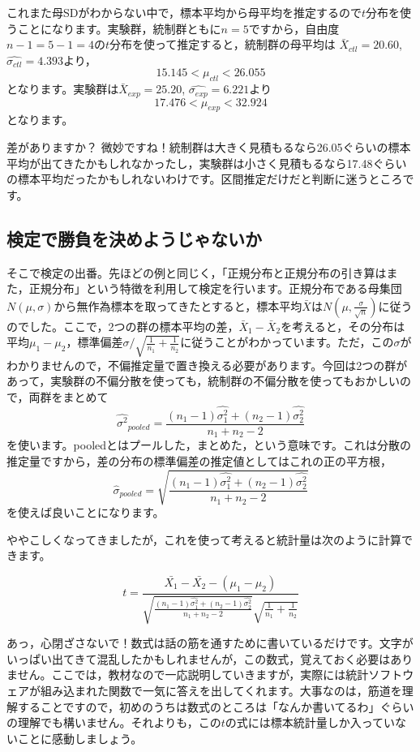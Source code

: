 \documentclass{ltjsbook}
\begin{document}
これまた母SDがわからない中で，標本平均から母平均を推定するので$t$分布を使うことになります。実験群，統制群ともに$n=5$ですから，自由度$n-1=5-1=4$の$t$分布を使って推定すると，統制群の母平均は
$\bar{X}_{ctl} =20.60$,$\hat{\sigma_{ctl}}=4.393$より，
\[15.145 < \mu_{ctl}<26.055 \]
となります。実験群は$\bar{X}_{exp} = 25.20$,
$\hat{\sigma_{exp}}=6.221$より
\[17.476<\mu_{exp}< 32.924 \]
となります。

差がありますか？ 微妙ですね！統制群は大きく見積もるなら26.05ぐらいの標本平均が出てきたかもしれなかったし，実験群は小さく見積もるなら17.48ぐらいの標本平均だったかもしれないわけです。区間推定だけだと判断に迷うところです。
\subsection{検定で勝負を決めようじゃないか}
そこで検定の出番。先ほどの例と同じく，「正規分布と正規分布の引き算はまた，正規分布」という特徴を利用して検定を行います。正規分布である母集団$N(\mu,\sigma)$から無作為標本を取ってきたとすると，標本平均$\bar{X}$は$N(\mu,\frac{\sigma}{\sqrt{n}})$に従うのでした。ここで，2つの群の標本平均の差，$\bar{X}_1 - \bar{X}_2$を考えると，その分布は平均$\mu_1-\mu_2$，標準偏差$\sigma/\sqrt{\frac{1}{n_1}+\frac{1}{n_2}}$に従うことがわかっています。ただ，この$\sigma$がわかりませんので，不偏推定量で置き換える必要があります。今回は2つの群があって，実験群の不偏分散を使っても，統制群の不偏分散を使ってもおかしいので，両群をまとめて
\[ \hat{\sigma^2}_{pooled} = \frac{(n_1-1)\hat{\sigma_1^2}+(n_2-1)\hat{\sigma_2^2}}{n_1+n_2 - 2}\]
を使います。pooledとはプールした，まとめた，という意味です。これは分散の推定量ですから，差の分布の標準偏差の推定値としてはこれの正の平方根，
\[ \hat{\sigma}_{pooled} = \sqrt{\frac{(n_1-1)\hat{\sigma_1^2}+(n_2-1)\hat{\sigma_2^2}}{n_1+n_2 - 2}}\]を使えば良いことになります。

ややこしくなってきましたが，これを使って考えると統計量は次のように計算できます。

\[ t = \frac{\bar{X_1}-\bar{X_2}-(\mu_1-\mu_2)}{\sqrt{\frac{(n_1-1)\hat{\sigma_1^2}+(n_2-1)\hat{\sigma_2^2}}{n_1+n_2 - 2}}\sqrt{\frac{1}{n_1}+\frac{1}{n_2}}}\]

あっ，心閉ざさないで！数式は話の筋を通すために書いているだけです。文字がいっぱい出てきて混乱したかもしれませんが，この数式，覚えておく必要はありません。ここでは，教材なので一応説明していきますが，実際には統計ソフトウェアが組み込まれた関数で一気に答えを出してくれます。大事なのは，筋道を理解することですので，初めのうちは数式のところは「なんか書いてるわ」ぐらいの理解でも構いません。それよりも，この$t$の式には標本統計量しか入っていないことに感動しましょう。
\end{document}

